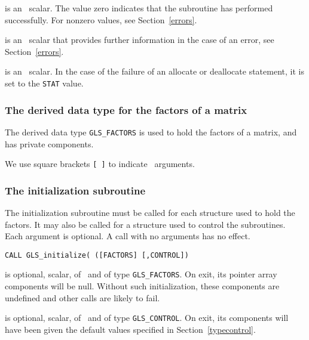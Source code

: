 \documentclass{galahad}
\newcommand{\packagename}{GLS}
\begin{document}
\begin{description}

 is an \integer\ scalar. The value
 zero indicates that the subroutine has performed
 successfully.  For nonzero values, see Section~\ref{errors}.

 is an \integer\ scalar that provides further information in the
case of an error, see Section~\ref{errors}.

 is an \integer\ scalar. In the case of the failure of an
allocate or deallocate statement, it is set to the {\tt STAT} value.

\end{description}


\subsubsection{The derived data type for the factors of a matrix}
The derived data type
{\tt \packagename\_FACTORS}
is used to hold the factors of a matrix, and has private components.


\galarguments
We use square brackets {\tt [ ]} to indicate \optional\ arguments.


\subsubsection{The initialization subroutine}\label{subinit}
The initialization subroutine must be called for each structure used
to hold the factors. It may also be called for a structure used to
control the subroutines. Each argument is optional. A call with no
arguments has no effect.
\vspace*{1mm}

\hspace{8mm}
{\tt CALL \packagename\_initialize( ([FACTORS] [,CONTROL])}

\begin{description}

 is optional, scalar, of \intentout\ and of type
{\tt \packagename\_FACTORS}. On exit, its pointer array components will be null.
Without such initialization, these components
are undefined and other calls are likely to fail.

 is optional, scalar, of \intentout\ and of type
{\tt \packagename\_CONTROL}. On exit, its components will have been
given the default values specified in
Section~\ref{typecontrol}.

\end{description}
\end{document}
